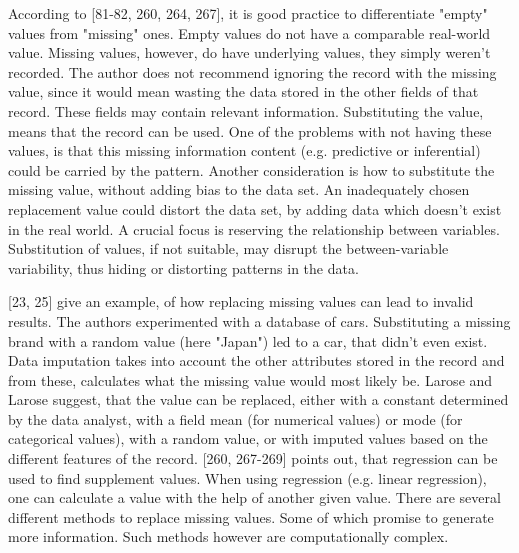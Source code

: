According to \textcite{dataPreparationForDataMining}[81-82, 260, 264, 267], it is good practice to differentiate "empty" values from "missing" ones. Empty values do not have a comparable real-world value. Missing values, however, do have underlying values, they simply weren't recorded. The author does not recommend ignoring the record with the missing value, since it would mean wasting the data stored in the other fields of that record. These fields may contain relevant information. Substituting the value, means that the record can be used. One of the problems with not having these values, is that this missing information content (e.g. predictive or inferential) could be carried by the pattern. Another consideration is how to substitute the missing value, without adding bias to the data set. An inadequately chosen replacement value could distort the data set, by adding data which doesn't exist in the real world. A crucial focus is reserving the relationship between variables. Substitution of values, if not suitable, may disrupt the between-variable variability, thus hiding or distorting patterns in the data. 

\textcite{DataMiningAndPredictiveAnalytics}[23, 25] give an example, of how replacing missing values can lead to invalid results. The authors experimented with a database of cars. Substituting a missing brand with a random value (here "Japan") led to a car, that didn't even exist. Data imputation takes into account the other attributes stored in the record and from these, calculates what the missing value would most likely be. Larose and Larose suggest, that the value can be replaced, either with a constant determined by the data analyst, with a field mean (for numerical values) or mode (for categorical values), with a random value, or with imputed values based on the different features of the record.  
\textcite{dataPreparationForDataMining}[260, 267-269] points out, that regression can be used to find supplement values. When using regression (e.g. linear regression), one can calculate a value with the help of another given value. There are several different methods to replace missing values. Some of which promise to generate more information. Such methods however are computationally complex.  




